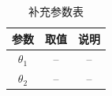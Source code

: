 \documentclass[UTF8,fontset=windows,a4paper,12pt]{ctexart}
\begin{document}
\begin{table}[H]
  \centering
  \caption{补充参数表}
  \begin{tabular}{ccc}
    \toprule
    参数 & 取值 & 说明 \\
    \midrule
    $\theta_1$ & -- & -- \\
    $\theta_2$ & -- & -- \\
    \bottomrule
  \end{tabular}
\end{table}

%
\end{document}

